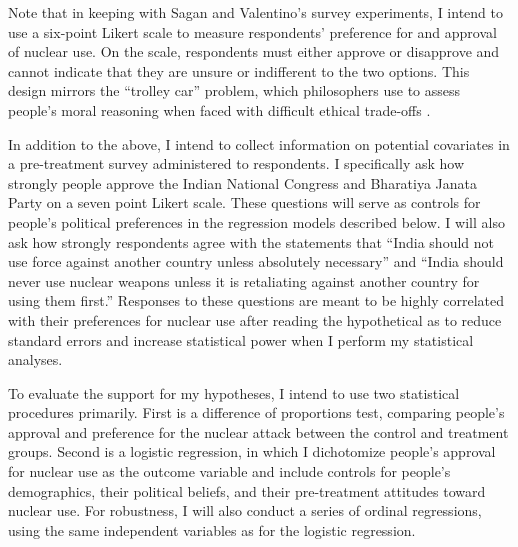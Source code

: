 \documentclass[12pt]{article}
\begin{document}
Note that in keeping with Sagan and Valentino's survey experiments, I intend to use a six-point Likert scale to measure respondents' preference for and approval of nuclear use. On the scale, respondents must either approve or disapprove and cannot indicate that they are unsure or indifferent to the two options. This design mirrors the ``trolley car'' problem, which philosophers use to assess people's moral reasoning when faced with difficult ethical trade-offs \citep{sagan_does_2020}.

In addition to the above, I intend to collect information on potential covariates in a pre-treatment survey administered to respondents. I specifically ask how strongly people approve the Indian National Congress and Bharatiya Janata Party on a seven point Likert scale. These questions will serve as controls for people's political preferences in the regression models described below. I will also ask how strongly respondents agree with the statements that ``India should not use force against another country unless absolutely necessary'' and ``India should never use nuclear weapons unless it is retaliating against another country for using them first.'' Responses to these questions are meant to be highly correlated with their preferences for nuclear use after reading the hypothetical as to reduce standard errors and increase statistical power when I perform my statistical analyses.

To evaluate the support for my hypotheses, I intend to use two statistical procedures primarily. First is a difference of proportions test, comparing people's approval and preference for the nuclear attack between the control and treatment groups. Second is a logistic regression, in which I dichotomize people's approval for nuclear use as the outcome variable and include controls for people's demographics, their political beliefs, and their pre-treatment attitudes toward nuclear use. For robustness, I will also conduct a series of ordinal regressions, using the same independent variables as for the logistic regression.

\section{}


\end{document}
